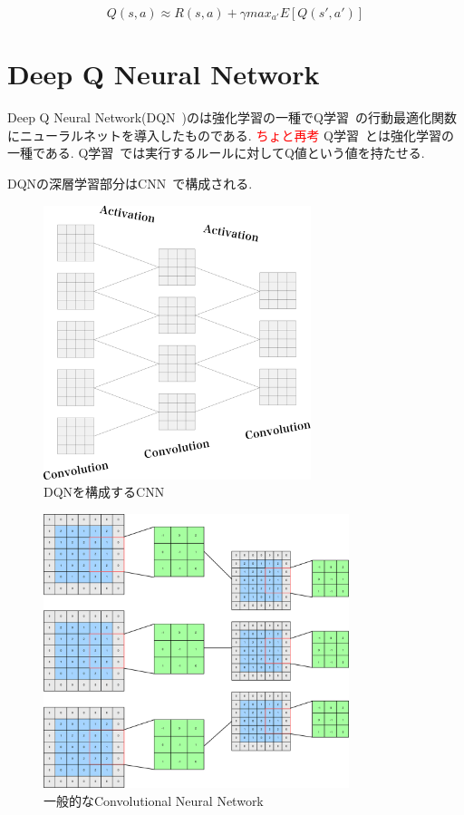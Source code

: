 \begin{equation}
    Q(s, a) \approx R(s, a) + \gamma max_{a'} E[Q(s', a')]
\end{equation}

\section{Deep Q Neural Network}

Deep Q Neural Network(DQN~\cite{DQN})のは強化学習の一種でQ学習~\cite{QL}の行動最適化関数にニューラルネットを導入したものである.
\textcolor{red}{ちょと再考}
Q学習~\cite{QL}とは強化学習の一種である. Q学習~\cite{QL}では実行するルールに対してQ値という値を持たせる.

DQNの深層学習部分はCNN~\cite{DQN}で構成される.

\begin{figure}[H]
    \centering
    \includegraphics[clip,height = 8.0cm]{assets/dqn_convolution.eps}
    \caption{DQNを構成するCNN}  \label{sample}
\end{figure}




\begin{figure}[H]
    \centering
    \includegraphics[clip,height = 8.0cm]{assets/CNN_typical.eps}
    \caption{一般的なConvolutional Neural Network}  \label{sample}
\end{figure}





